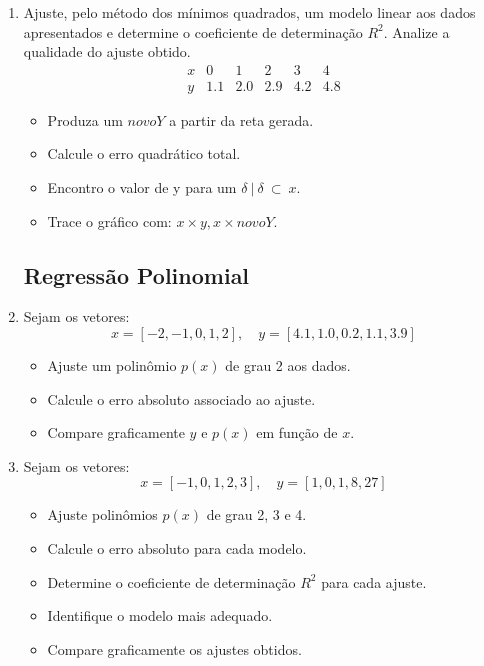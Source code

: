 \begin{enumerate}
\item Ajuste, pelo método dos mínimos quadrados, um modelo linear aos dados apresentados e determine o coeficiente de determinação $R^2$. 
Analize a qualidade do ajuste obtido.
\[
\begin{array}{c|ccccc}
x & 0 & 1 & 2 & 3 & 4 \\
y & 1.1 & 2.0 & 2.9 & 4.2 & 4.8
\end{array}
\]
\begin{itemize}
    \item Produza um $novoY$ a partir da reta gerada.
    \item Calcule o erro quadrático total.
    \item Encontro o valor de y para um $ \delta\ | \ \delta\ \subset  \ x$.
    \item Trace o gráfico com: $ x \times y , x \times novoY$. 
\end{itemize}

\subsection{Regressão Polinomial}

\item Sejam os vetores:
\[
x = [-2, -1, 0, 1, 2], \quad y = [4.1, 1.0, 0.2, 1.1, 3.9]
\]

\begin{itemize}
    \item Ajuste um polinômio $p(x)$ de grau 2 aos dados.
    \item Calcule o erro absoluto associado ao ajuste.
    \item Compare graficamente $y$ e $p(x)$ em função de $x$.
\end{itemize}

\item Sejam os vetores:
\[
x = [-1, 0, 1, 2, 3], \quad y = [1, 0, 1, 8, 27]
\]

\begin{itemize}
    \item Ajuste polinômios $p(x)$ de grau 2, 3 e 4.
    \item Calcule o erro absoluto para cada modelo.
    \item Determine o coeficiente de determinação $R^2$ para cada ajuste.
    \item Identifique o modelo mais adequado.
    \item Compare graficamente os ajustes obtidos.
\end{itemize}


\end{enumerate}
